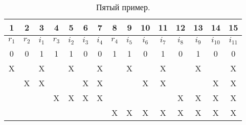 \begin{table}[hbt!]
    \centering
    \begin{tabular}{| c | c | c | c | c | c | c | c | c | c | c | c | c | c | c |}
        \hline
        1     & 2     & 3     & 4     & 5     & 6     & 7     & 8     & 9     & 10    & 11    & 12    & 13    & 14       & 15       \\
        \hline
        $r_1$ & $r_2$ & $i_1$ & $r_3$ & $i_2$ & $i_3$ & $i_4$ & $r_4$ & $i_5$ & $i_6$ & $i_7$ & $i_8$ & $i_9$ & $i_{10}$ & $i_{11}$ \\
        \hline
        0     & 0     & 1     & 1     & 1     & 0     & 0     & 1     & 1     & 0     & 1     & 0     & 1     & 0        & 0        \\
        \hline
        X     &       & X     &       & X     &       & X     &       & X     &       & X     &       & X     &          & X        \\
        \hline
              & X     & X     &       &       & X     & X     &       &       & X     & X     &       &       & X        & X        \\
        \hline
              &       &       & X     & X     & X     & X     &       &       &       &       & X     & X     & X        & X        \\
        \hline
              &       &       &       &       &       &       & X     & X     & X     & X     & X     & X     & X        & X        \\
        \hline
    \end{tabular}
    \caption{Пятый пример. }
\end{table}



\clearpage

